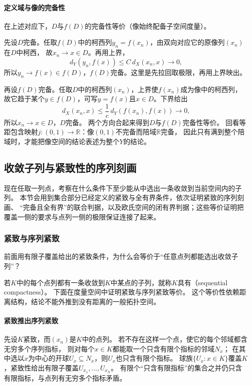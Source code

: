 \paragraph{定义域与像的完备性}

在上述对应下，$D$与$f(D)$的完备性等价（像始终配备子空间度量）。

先设$D$完备。任取$f(D)$中的柯西列$y_n=f(x_n)$，由双向对应它的原像列$(x_n)$在$D$中柯西，
故$x_n\to x\in D$。再用上界，
\[
  d_Y(y_n,f(x))\leq C\,d_X(x_n,x)\to0,
\]
所以$y_n\to f(x)\in f(D)$，$f(D)$完备。这里是先拉回取极限，再用上界映出。

再设$f(D)$完备。任取$D$中的柯西列$(x_n)$，上界使$f(x_n)$成为像中的柯西列，
故它趋于某个$y\in f(D)$，可写$y=f(x)$且$x\in D$。下界给出
\[
  d_X(x_n,x)\leq\frac1c\,d_Y(f(x_n),f(x))\to0,
\]
所以$x_n\to x\in D$，$D$完备。
两个方向合起来得到$D$与$f(D)$完备性等价。
回看等距包含映射$j:(0,1)\to\mathbb R$：像$(0,1)$不完备而陪域$\mathbb R$完备，
因此只有满到整个陪域时，才能把像空间的结论表述为整个$Y$的结论。

\subsection{收敛子列与紧致性的序列刻画}
\label{sec:metric-compactness-tests}

现在任取一列点，考察在什么条件下至少能从中选出一条收敛到当前空间内的子列。
本节会用到集合部分已经定义的紧致与全有界条件，依次证明紧致的序列刻画、
“完备且全有界”的联合判据，以及欧氏空间的闭有界判据；这些等价证明把覆盖一侧的要求与点列一侧的极限保证连接了起来。

\subsubsection{紧致与序列紧致}
\label{sec:metric-compact-sequential-tests}

前面用有限子覆盖给出的紧致条件，为什么会等价于“任意点列都能选出收敛子列”？

若$K$中的每个点列都有一条收敛到$K$中某点的子列，就称$K$具有（sequential compactness）。
下面在度量空间中证明紧致与序列紧致等价。
这个等价性依赖距离结构，结论不能外推到没有距离的一般拓扑空间。

\paragraph{紧致推出序列紧致}

先设$K$紧致，而$(x_n)$是$K$中的点列。
若不存在这样一个点，使它的每个邻域都含无穷多个序列指标，
则对每个$x\in K$都能取一个只含有限个指标的邻域$N_x$；
在其中选以$x$为中心的开球$U_x\subseteq N_x$，则$U_x$也只含有限个指标。
球族$\{U_x:x\in K\}$覆盖$K$，紧致性给出有限子覆盖$U_{x_1},\ldots,U_{x_N}$。
有限个“只含有限指标”的集合之并仍只含有限指标，与点列有无穷多个指标矛盾。

